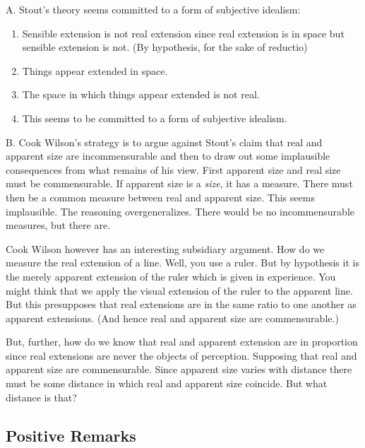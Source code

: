\documentclass[11pt]{article}
\begin{document}
A. Stout's theory seems committed to a form of subjective idealism:

    \begin{enumerate}
    	\item Sensible extension is not real extension since real extension is in space but sensible extension is not. (By hypothesis, for the sake of reductio)
	    \item Things appear extended in space.
	    \item The space in which things appear extended is not real.
	    \item This seems to be committed to a form of subjective idealism.
    \end{enumerate}
    
B. Cook Wilson's strategy is to argue against Stout's claim that real and apparent size are incommensurable and then to draw out some implausible consequences from what remains of his view. First apparent size and real size must be commensurable. If apparent size is a \emph{size}, it has a measure. There must then be a common measure between real and apparent size. This seems implausible. The reasoning overgeneralizes. There would be no incommensurable measures, but there are. 

Cook Wilson however has an interesting subsidiary argument. How do we measure the real extension of a line. Well, you use a ruler. But by hypothesis it is the merely apparent extension of the ruler which is given in experience. You might think that we apply the visual extension of the ruler to the apparent line. But this presupposes that real extensions are in the same ratio to one another as apparent extensions. (And hence real and apparent size are commensurable.) 

But, further, how do we know that real and apparent extension are in proportion since real extensions are never the objects of perception. Supposing that real and apparent size are commensurable. Since apparent size varies with distance there must be some distance in which real and apparent size coincide. But what distance is that?


\subsection{Positive Remarks}\label{sub:positive_remarks} %
\end{document}
